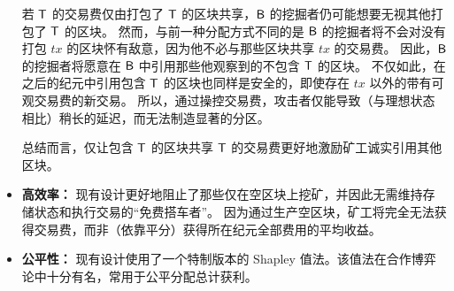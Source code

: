 \begin{itemize}
		若 $\textsf{T}$ 的交易费仅由打包了 $\textsf{T}$ 的区块共享，$\textsf{B}$ 的挖掘者仍可能想要无视其他打包了 $\textsf{T}$ 的区块。
		然而，与前一种分配方式不同的是 $\textsf{B}$ 的挖掘者将不会对没有打包 $tx$ 的区块怀有敌意，因为他不必与那些区块共享 $tx$ 的交易费。
		因此，$\textsf{B}$ 的挖掘者将愿意在 $\textsf{B}$ 中引用那些他观察到的不包含 $\textsf{T}$ 的区块。
		不仅如此，在之后的纪元中引用包含 $\textsf{T}$ 的区块也同样是安全的，即使存在 $tx$ 以外的带有可观交易费的新交易。
		所以，通过操控交易费，攻击者仅能导致（与理想状态相比）稍长的延迟，而无法制造显著的分区。

		总结而言，仅让包含 $\textsf{T}$ 的区块共享 $\textsf{T}$ 的交易费更好地激励矿工诚实引用其他区块。

		\item {\bf 高效率：} 
		现有设计更好地阻止了那些仅在空区块上挖矿，并因此无需维持存储状态和执行交易的“免费搭车者”。
		因为通过生产空区块，矿工将完全无法获得交易费，而非（依靠平分）获得所在纪元全部费用的平均收益。

		\item {\bf 公平性：}
		现有设计使用了一个特制版本的 Shapley 值法。该值法在合作博弈论中十分有名，常用于公平分配总计获利。
	\end{itemize}




